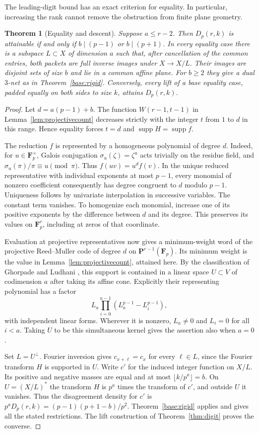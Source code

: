 \documentclass[11pt,letterpaper]{article}
\newcommand{\Fp}{\mathbf F_p}
\newtheorem{theorem}{Theorem}[section]
\theoremstyle{remark}
\begin{document}
The leading-digit bound has an exact criterion for equality. In particular,
increasing the rank cannot remove the obstruction from finite plane geometry.

\begin{theorem}[Equality and descent]\label{thm:descent}
Suppose $a\le r-2$. Then $D_p(r,k)$ is attainable if and only if
$b\mid(p-1)$ or $b\mid(p+1)$. In every equality case there is a subspace
$L\subset X$ of dimension $a$ such that, after cancellation of the common
entries, both packets are full inverse images under $X\to X/L$.
Their images are disjoint sets of size $b$ and lie in a common affine
plane. For $b\ge2$ they give a dual $3$-net as in Theorem~\ref{base:rigid}.
Conversely, every lift of a base equality case, padded equally on both
sides to size $k$, attains $D_p(r,k)$.
\end{theorem}

\begin{proof}
Let $d=a(p-1)+b$. The function $W(r-1,t-1)$ in
Lemma~\ref{lem:projectivecount} decreases strictly with the integer $t$
from $1$ to $d$ in this range. Hence equality forces $t=d$ and
$\operatorname{supp}H=\operatorname{supp}f$.

The reduction $f$ is represented by a homogeneous polynomial of degree $d$.
Indeed, for $u\in\Fp^\times$, Galois conjugation $\sigma_u(\zeta)=\zeta^u$
acts trivially on the residue field, and $\sigma_u(\pi)/\pi\equiv u\pmod\pi$.
Thus $f(uv)=u^d f(v)$. In the unique reduced representative with individual
exponents at most $p-1$, every monomial of nonzero coefficient consequently
has degree congruent to $d$ modulo $p-1$. Uniqueness follows by univariate
interpolation in successive variables. The constant term vanishes.
To homogenize each monomial, increase one of its positive exponents by
the difference between $d$ and its degree. This preserves its values
on $\Fp^r$, including at zeros of that coordinate.

Evaluation at projective representatives now gives a minimum-weight
word of the projective Reed--Muller code of degree $d$ on
$\mathbf P^{r-1}(\Fp)$. Its minimum weight is the value in
Lemma~\ref{lem:projectivecount}, attained here. By the classification
of Ghorpade and Ludhani \cite[Thm.~4.3]{GL}, this support is contained
in a linear space $U\subset V$ of codimension $a$ after taking its
affine cone. Explicitly their representing polynomial has a factor
\[
 L_a\prod_{i=0}^{a-1}(L_a^{p-1}-L_i^{p-1}),
\]
with independent linear forms. Wherever it is nonzero,
$L_a\ne0$ and $L_i=0$ for all $i<a$. Taking $U$ to be this simultaneous
kernel gives the assertion also when $a=0$.

Set $L=U^\perp$. Fourier inversion gives $c_{x+\ell}=c_x$ for every
$\ell\in L$, since the Fourier transform $H$ is supported in $U$.
Write $c'$ for the induced integer function on $X/L$. Its positive
and negative masses are equal and at most $\lfloor k/p^a\rfloor=b$.
On $U=(X/L)^*$ the transform $H$ is $p^a$ times the transform of $c'$,
and outside $U$ it vanishes. Thus the disagreement density for $c'$ is
$p^aD_p(r,k)=(p-1)(p+1-b)/p^2$. Theorem~\ref{base:rigid} applies
and gives all the stated restrictions. The lift construction of
Theorem~\ref{thm:digit} proves the converse.
\end{proof}
\end{document}
